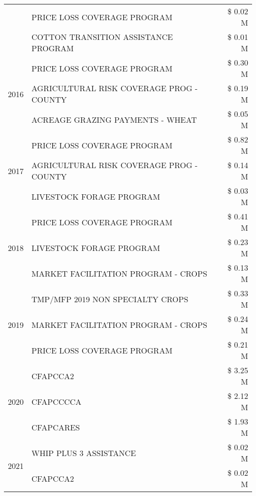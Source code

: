 \begin{tabular}{llr}
 & PRICE LOSS COVERAGE PROGRAM & \$ 0.02 M \\
 & COTTON TRANSITION ASSISTANCE PROGRAM & \$ 0.01 M \\
\cline{1-3}
\multirow[t]{3}{*}{2016} & PRICE LOSS COVERAGE PROGRAM & \$ 0.30 M \\
 & AGRICULTURAL RISK COVERAGE PROG - COUNTY & \$ 0.19 M \\
 & ACREAGE GRAZING PAYMENTS - WHEAT & \$ 0.05 M \\
\cline{1-3}
\multirow[t]{3}{*}{2017} & PRICE LOSS COVERAGE PROGRAM & \$ 0.82 M \\
 & AGRICULTURAL RISK COVERAGE PROG - COUNTY & \$ 0.14 M \\
 & LIVESTOCK FORAGE PROGRAM & \$ 0.03 M \\
\cline{1-3}
\multirow[t]{3}{*}{2018} & PRICE LOSS COVERAGE PROGRAM & \$ 0.41 M \\
 & LIVESTOCK FORAGE PROGRAM & \$ 0.23 M \\
 & MARKET FACILITATION PROGRAM - CROPS & \$ 0.13 M \\
\cline{1-3}
\multirow[t]{3}{*}{2019} & TMP/MFP 2019 NON SPECIALTY CROPS & \$ 0.33 M \\
 & MARKET FACILITATION PROGRAM - CROPS & \$ 0.24 M \\
 & PRICE LOSS COVERAGE PROGRAM & \$ 0.21 M \\
\cline{1-3}
\multirow[t]{3}{*}{2020} & CFAPCCA2 & \$ 3.25 M \\
 & CFAPCCCCA & \$ 2.12 M \\
 & CFAPCARES & \$ 1.93 M \\
\cline{1-3}
\multirow[t]{2}{*}{2021} & WHIP PLUS 3 ASSISTANCE & \$ 0.02 M \\
 & CFAPCCA2 & \$ 0.02 M \\
\cline{1-3}
\bottomrule
\end{tabular}
